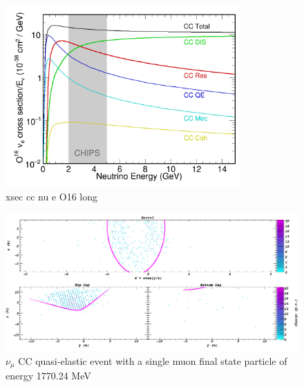 \begin{figure} %
    \includegraphics[width=0.8\textwidth]{diagrams/5-chips/xsec_cc_nu_e_O16.png}
    \caption[xsec cc nu e O16 short]
    {xsec cc nu e O16 long}
    \label{fig:xsec_cc_nu_e_O16}
\end{figure} %

\begin{figure} %
    \includegraphics[width=\textwidth]{diagrams/5-chips/sim_event.png}
    \caption[sim event short]
    {$\nu_{\mu}$ CC quasi-elastic event with a single muon final state particle of energy
        1770.24 MeV}
    \label{fig:sim_event}
\end{figure} %

